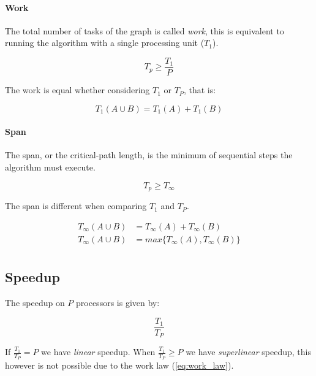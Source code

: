 \paragraph{Work}

The total number of tasks of the graph is called \textit{work},
this is equivalent to running the algorithm with a single processing unit ($T_1$).

\begin{equation}\label{eq:work_law}
    T_p \ge \frac{T_1}{P}
\end{equation}

The work is equal whether considering $T_1$ or $T_P$,
that is:

\begin{equation}
    T_1 (A \cup B) = T_1(A) + T_1(B)
\end{equation}

\paragraph{Span}

The span, or the critical-path length, is the minimum of sequential steps the algorithm must execute.

\begin{equation}\label{eq:span_law}
    T_p \ge T_{\infty}
\end{equation}

The span is different when comparing $T_1$ and $T_P$.

\begin{equation}
    \begin{split}
        T_{\infty} (A \cup B) & = T_{\infty}(A) + T_{\infty}(B)\\
        T_{\infty} (A \cup B) & = max\{T_{\infty}(A), T_{\infty}(B)\}\\
    \end{split}
\end{equation}

\subsection{Speedup}

The speedup on $P$ processors is given by:

\begin{equation}
    \frac{T_1}{T_P}
\end{equation}

If $\frac{T_1}{T_P} = P$ we have \textit{linear} speedup.
When $\frac{T_1}{T_P} \ge P$ we have \textit{superlinear} speedup,
this however is not possible due to the work law (\autoref{eq:work_law}).

